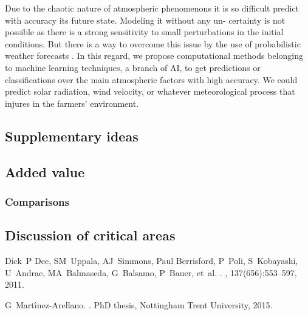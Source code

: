 Due to the chaotic nature of atmospheric phenomenons it is so difficult predict with accuracy its future state. Modeling it without any un- certainty is not possible as there is a strong sensitivity to small perturbations in the initial conditions. But there is a way to overcome this issue by the use of probabilistic weather forecasts \cite{martinez2015forecasting}. In this regard, we propose computational methods belonging to machine learning techniques, a branch of AI, to get predictions or classifications over the main atmospheric factors with high accuracy. We could predict solar radiation, wind velocity, or whatever meteorological process that injures in the farmers' environment.



\subsection{Supplementary ideas}
\subsection{Added value}
\subsubsection{Comparisons}	
\subsection{Discussion of critical areas}



\begin{thebibliography}{100}

Dick~P Dee, SM~Uppala, AJ~Simmons, Paul Berrisford, P~Poli, S~Kobayashi,
  U~Andrae, MA~Balmaseda, G~Balsamo, P~Bauer, et~al.
.
,
  137(656):553--597, 2011. 

G~Mart{\'\i}nez-Arellano.
.
\newblock PhD thesis, Nottingham Trent University, 2015.

\end{thebibliography} 
